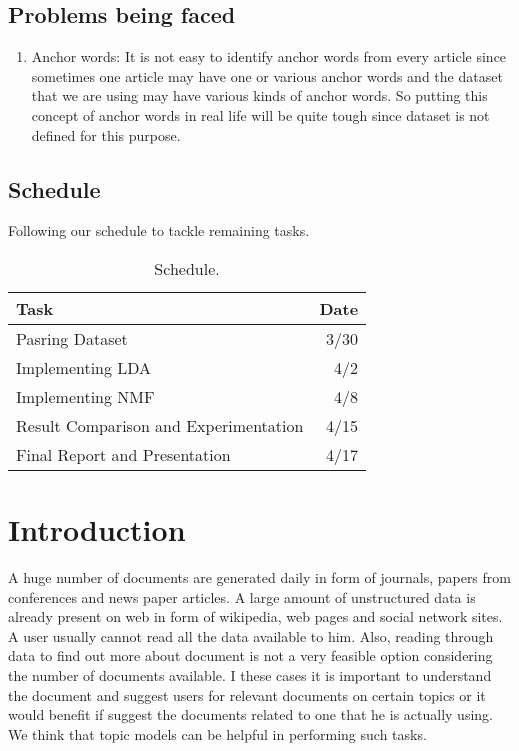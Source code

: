 \documentclass[a4paper,11pt]{article}
\begin{document}
\subsection{Problems being faced}
\begin{enumerate}
\item Anchor words: It is not easy to identify anchor words from every article since sometimes one article may have one or various anchor words and the dataset that we are using may have various kinds of anchor words. So putting this concept of anchor words in real life will be quite tough since dataset is not defined for this purpose.

\end{enumerate}


\subsection{Schedule}
Following our schedule to tackle remaining tasks. 
\begin{table}
\centering
\begin{tabular}{l|r}
Task & Date\\\hline
Pasring Dataset & 3/30 \\
Implementing LDA & 4/2 \\
Implementing NMF & 4/8 \\
Result Comparison and Experimentation & 4/15 \\
Final Report and Presentation & 4/17
\end{tabular}
\caption{\label{tab:widgets}Schedule.}
\end{table}

\pagebreak

\section{Introduction}
A huge number of documents are generated daily in form of journals, papers from conferences and  news paper articles. A large amount of unstructured data is already present on web in form of wikipedia, web pages and social network sites. A user usually cannot read all the data available to him. Also, reading through data to find out more about document is not a very feasible option considering the number of documents available. I these cases it is important to understand the document and suggest users for relevant documents on certain topics or it would benefit if suggest the documents related to one that he is actually using. We think that topic models can be helpful in performing such tasks. \\
\end{document}
